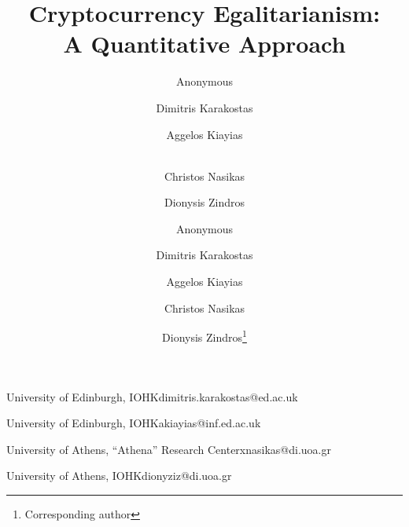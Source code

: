 
\title{Cryptocurrency Egalitarianism:\protect\\A Quantitative Approach}

\iflncs
  \ifanonymous
    \author{Anonymous}
    \institute{}
  \else
    \author{
           Dimitris Karakostas  \and
           Aggelos Kiayias  \and\\
           Christos Nasikas  \and
           Dionysis Zindros 
    }
  \fi
\else

  \ifanonymous
  \author{Anonymous}{}{}{}{}
  \else
    \author{Dimitris Karakostas}{University of Edinburgh, IOHK}{dimitris.karakostas@ed.ac.uk}{}{}

    \author{Aggelos Kiayias}{University of Edinburgh, IOHK}{akiayias@inf.ed.ac.uk}{}{}
    \author{Christos Nasikas}{University of Athens, ``Athena'' Research Center}{xnasikas@di.uoa.gr}{}{}
    \author{Dionysis Zindros\footnote{Corresponding author}}{University of Athens, IOHK}{dionyziz@di.uoa.gr}{}{}

  \fi
\fi
\maketitle
